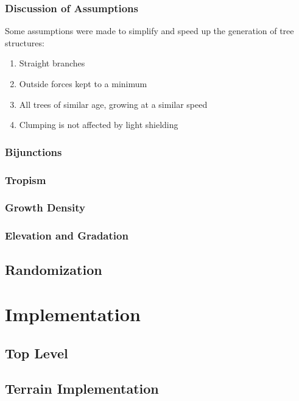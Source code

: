 \documentclass{article}
\newcommand{\tab}{\hspace*{2em}}
\begin{document}
            \subsubsection{Discussion of Assumptions}
    \tab Some assumptions were made to simplify and speed up the generation of tree structures:
\begin{enumerate}
    \item Straight branches
    \item Outside forces kept to a minimum
    \item All trees of similar age, growing at a similar speed
    \item Clumping is not affected by light shielding
\end{enumerate}

            \subsubsection{Bijunctions} %
            \subsubsection{Tropism}
            \subsubsection{Growth Density}
            \subsubsection{Elevation and Gradation}

        \subsection{Randomization}

    \section{Implementation}
        \subsection{Top Level}

        \subsection{Terrain Implementation}
\end{document}
